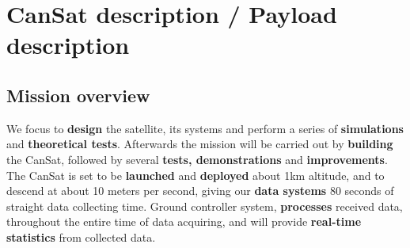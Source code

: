 \documentclass[11pt]{article}
\begin{document}
\section{CanSat description / Payload description}

\subsection{Mission overview}
\hspace{0.5cm} We focus to \textbf{design} the satellite, its systems and perform a series of \textbf{simulations} and \textbf{theoretical tests}. Afterwards the mission will be carried out by \textbf{building} the CanSat, followed by several \textbf{tests, demonstrations} and \textbf{improvements}. The CanSat is set to be \textbf{launched} and \textbf{deployed} about 1km altitude, and to descend at about 10 meters per second, giving our \textbf{data systems} 80 seconds of straight data collecting time. Ground controller system, \textbf{processes} received data, throughout the entire time of data acquiring, and will provide \textbf{real-time statistics} from collected data.
\vspace{0.25cm}
\end{document}
